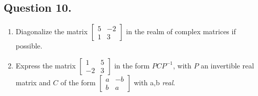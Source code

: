 \documentclass{article}
\begin{document}
\subsection*{Question 10.}
\begin{enumerate} [label=(\arabic*)]
    \item Diagonalize the matrix $\left[\begin{array}{rr}
    5 & -2 \\
    1 & 3
    \end{array}\right]$ in the realm of complex matrices if possible.
    \item Express the matrix $\left[\begin{array}{rr}
    1 & 5 \\
    -2 & 3
    \end{array}\right]$ in the form $PCP^{-1}$, with $P$ an invertible real matrix and $C$ of the form $\left[\begin{array}{rr}
    a & -b \\
    b & a
    \end{array}\right]$ with a,b \textit{real}.
\end{enumerate}
\end{document}
